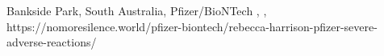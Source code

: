           {Bankside Park, South Australia, }
          {}
          {Pfizer/BioNTech}  
          {}
          {
            ,
            ,
          }
          {https://nomoresilence.world/pfizer-biontech/rebecca-harrison-pfizer-severe-adverse-reactions/}


